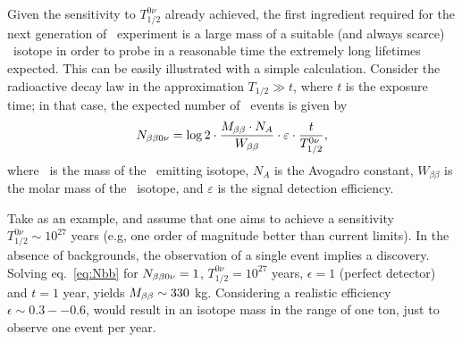 
Given the sensitivity to $T_{1/2}^{0\nu}$ already achieved, the first ingredient required for the next generation of \bbonu\ experiment is a 
 large mass of a suitable (and always scarce) \bb\ isotope in order to probe in a reasonable time the extremely long lifetimes expected. 
 This can be easily illustrated with a simple calculation. Consider the radioactive decay law in the approximation $T_{1/2}\gg t$, where $t$ is the exposure time; in that case, the expected number of \bbonu\ events is given by
%
\begin{equation}
N_{\beta\beta0\nu} = \log2 \cdot \frac{M_{\beta\beta}\cdot N_{A}}{W_{\beta\beta}} \cdot \varepsilon \cdot \frac{t}{T_{1/2}^{0\nu}}, 
\label{eq:Nbb}
\end{equation}
%
where \Mbb\ is the mass of the \bb\ emitting isotope, $N_{A}$ is the Avogadro constant, $W_{\beta\beta}$ is the molar mass of the \bb\ isotope, and $\varepsilon$ is the signal detection efficiency.

Take  as an example, and assume that one aims to achieve a sensitivity 
$T_{1/2}^{0\nu}\sim 10^{27}$ years (e.g, one order of magnitude better than current limits). In the absence of backgrounds, the observation of a single event implies a discovery. Solving eq.~\ref{eq:Nbb} for $ N_{\beta\beta0\nu}=1$, $T_{1/2}^{0\nu} = 10^{27}$ years, $\epsilon = 1$ (perfect detector) and $t = 1$ year, yields  $M_{\beta\beta} \sim 330$ kg. Considering a realistic efficiency $\epsilon \sim 0.3--0.6$, would result in an isotope mass in the range of one ton, just to observe one event per year.  

